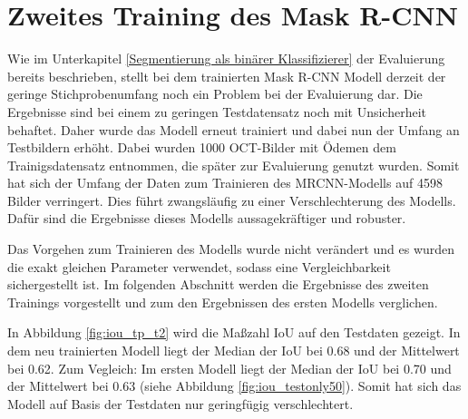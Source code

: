 \section{Zweites Training des Mask R-CNN}


Wie im Unterkapitel \ref{Segmentierung als binärer Klassifizierer} der Evaluierung bereits beschrieben, stellt bei dem trainierten Mask R-CNN Modell derzeit der geringe Stichprobenumfang noch ein Problem bei der Evaluierung dar. Die Ergebnisse sind bei einem zu geringen Testdatensatz noch mit Unsicherheit behaftet. 
Daher wurde das Modell erneut trainiert und dabei nun der Umfang an Testbildern erhöht.
Dabei wurden 1000 OCT-Bilder mit Ödemen dem Trainigsdatensatz entnommen, die später zur Evaluierung genutzt wurden. 
Somit hat sich der Umfang der Daten zum Trainieren des MRCNN-Modells auf 4598 Bilder verringert. Dies führt zwangsläufig zu einer Verschlechterung des Modells. Dafür sind die Ergebnisse dieses Modells aussagekräftiger und robuster. 

Das Vorgehen zum Trainieren des Modells wurde nicht verändert und es wurden die exakt gleichen Parameter verwendet, sodass eine Vergleichbarkeit sichergestellt ist. 
Im folgenden Abschnitt werden die Ergebnisse des zweiten Trainings vorgestellt und zum den Ergebnissen des ersten Modells verglichen. 

In Abbildung \ref{fig:iou_tp_t2} wird die Maßzahl IoU auf den Testdaten gezeigt. 
In dem neu trainierten Modell liegt der Median der IoU bei 0.68 und der Mittelwert bei 0.62.
Zum Vegleich: Im ersten Modell liegt der Median der IoU bei 0.70 und der Mittelwert bei 0.63 (siehe Abbildung \ref{fig:iou_testonly50}).
Somit hat sich das Modell auf Basis der Testdaten nur geringfügig verschlechtert. 




